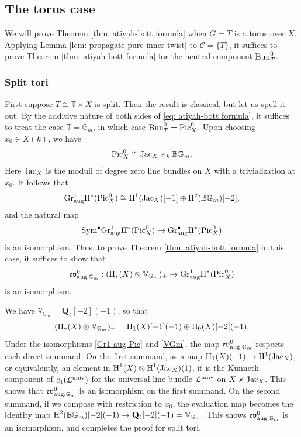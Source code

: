 \documentclass[reqno]{amsart}
\numberwithin{equation}{subsection}
\theoremstyle{definition}
\def\BB{\mathbb{B}}
\def\GG{\mathbb{G}}
\def\TT{\mathbb{T}}
\def\VV{\mathbb{V}}
\newcommand\cC{\mathcal{C}}
\newcommand\cL{\mathcal{L}}
\newcommand{\Bun}{\textup{Bun}}
\newcommand{\Gr}{\textup{Gr}}
\newcommand\Jac{\textup{Jac}}
\newcommand{\Pic}{\textup{Pic}}
\newcommand\Sym{\textup{Sym}}
\newcommand{\univ}{\textup{univ}}
\newcommand{\Gm}{\GG_m}
\newcommand\upH{\textup{H}}
\newcommand{\Ql}{\Q_{\ell}}
\newcommand{\bu}{\bullet}
\newcommand\op{\oplus}
\newcommand\ot{\otimes}
\newcommand\aug{\textup{aug}}
\newcommand\frev{\mathfrak{ev}}
\newcommand{\Q}{\mathbf{Q}}
\newcommand{\rH}{\ensuremath{\mathrm{H}}\xspace}
\begin{document}
\subsection{The torus case} We will prove Theorem \ref{thm: atiyah-bott formula} when $G = T$ is a torus over $X$. Applying Lemma \ref{lem: propagate pure inner twist} to $\cC=\{T\}$, it suffices to prove Theorem \ref{thm: atiyah-bott formula} for the neutral component $\Bun^{0}_{T}$.


\subsubsection{Split tori}
First suppose $T \cong \TT\times X$ is split. Then the result is classical, but let us spell it out. By the additive nature of both sides of \eqref{eq: atiyah-bott formula}, it suffices to treat the case $\TT=\Gm$, in which case $\Bun^{0}_{T}=\Pic^{0}_{X}$. Upon choosing $x_{0}\in X(k)$, we have
\begin{equation*}
\Pic^{0}_{X} \cong \Jac_{X} \times_k \BB \Gm.
\end{equation*}
Here $\Jac_{X}$ is the moduli of degree zero line bundles on $X$ with a trivialization at $x_{0}$. It follows that
\begin{equation}\label{Gr1 aug Pic}
\Gr^{1}_{\aug}\upH^{*}(\Pic^{0}_{X})\cong \upH^{1}(\Jac_{X})[-1]\op \upH^{2}(\BB\Gm)[-2],
\end{equation}
and the natural map
\begin{equation*}
\Sym^{\bu}\Gr^{1}_{\aug}\upH^{*}(\Pic^{0}_{X})\to \Gr^{\bu}_{\aug}\upH^{*}(\Pic^{0}_{X})
\end{equation*}
is an isomorphism. Thus, to prove Theorem \ref{thm: atiyah-bott formula} in this case, it suffices to show that
\begin{equation*}
\frev^{0}_{\aug, \Gm}: (\upH_{*}(X)\ot \VV_{\Gm})_{+}\to \Gr^{1}_{\aug}\upH^{*}(\Pic^{0}_{X})
\end{equation*}
is an isomorphism.

We have $\VV_{\Gm}=\Ql[-2](-1)$, so that
\begin{equation}\label{VGm}
(\upH_{*}(X)\ot \VV_{\Gm})_{+}=\rH_1(X)[-1](-1) \op \rH_{0}(X)[-2](-1).
\end{equation}
Under the isomorphisms \eqref{Gr1 aug Pic} and \eqref{VGm}, the map $\frev^{0}_{\aug, \Gm}$ respects each direct summand. On the first summand, as a map $\rH_1(X)(-1)\to \upH^{1}(\Jac_{X})$, or equivalently, an element in $\upH^{1}(X)\ot \upH^{1}(\Jac_{X})(1)$, it is the K\"unneth component of $c_{1}(\cL^{\univ})$ for the  universal line bundle $\cL^{\univ}$ on $X\times \Jac_{X}$. This shows that $\frev^{0}_{\aug, \Gm}$ is an isomorphism on the first summand. On the second summand, if we compose with restriction to $x_{0}$, the evaluation map becomes the identity map $\upH^{2}(\BB\Gm)[-2](-1)\to \Ql[-2](-1)=\VV_{\Gm}$. This shows $\frev^{0}_{\aug, \Gm}$ is an isomorphism, and completes the proof for split tori.
\end{document}
